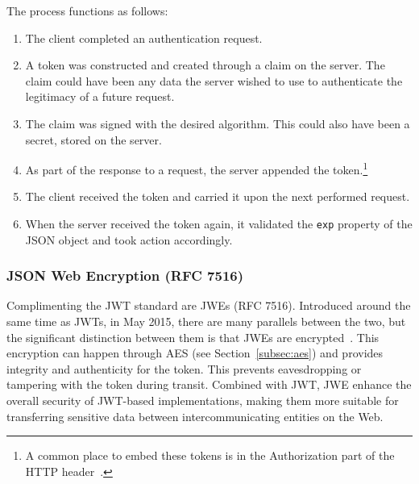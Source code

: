 The process functions as follows:
\begin{enumerate}
  \item The client completed an authentication request.
  \item A token was constructed and created through a claim on the server.
  The claim could have been any data the server wished to use to authenticate
  the legitimacy of a future request.
  \item The claim was signed with the desired algorithm.
  This could also have been a secret, stored on the server.
  \item As part of the response to a request, the server appended the
  token.\footnote{
    A common place to embed these tokens is in the Authorization part of the
    HTTP header~\cite{RFC7519}.
  }
  \item The client received the token and carried it upon the next performed
  request.
  \item When the server received the token again,
  it validated the \texttt{exp} property of the JSON object and took action
  accordingly.
\end{enumerate}

\subsubsection{JSON Web Encryption (RFC 7516)}
Complimenting the JWT standard are JWEs (RFC 7516).
Introduced around the same time as JWTs, in May 2015, there are many parallels
between the two, but the significant distinction between them is that JWEs are
encrypted~\cite{rfc7516}.
This encryption can happen through AES (see Section~\ref{subsec:aes}) and
provides integrity and authenticity for the token.
This prevents eavesdropping or tampering with the token during transit.
Combined with JWT, JWE enhance the overall security of JWT-based implementations,
making them more suitable for transferring sensitive data between
intercommunicating entities on the Web.
